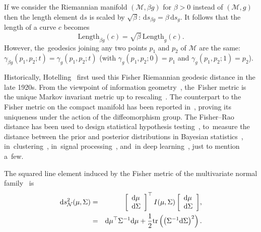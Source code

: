 \documentclass[entropy,article,accept,oneauthor,pdftex,entropy]{Definitions/mdpi}
\def\calM{\mathcal{M}}
\def\vectortwo#1#2{{\left[\begin{array}{l}#1 \cr #2\end{array}\right]}}
\def\tr{\mathrm{tr}}
\def\calN{\mathcal{N}}
\def\Length{\mathrm{Length}}
\def\dSigma{\mathrm{d}\Sigma}
\def\dmu{\mathrm{d}\mu}
\def\ds{\mathrm{d}s}
\begin{document}
\begin{Remark}
If we consider the Riemannian manifold $(\calM,\beta g)$ for $\beta>0$ instead of $(\calM,g)$ then the length element $\ds$ is scaled by $\sqrt{\beta}$: $\ds_{\beta g}=\beta\, \ds_g$. It follows that the length of a curve $c$ becomes
$$
\Length_{\beta g}(c)=\sqrt{\beta}\, \Length_{g}(c).
$$
However, the~geodesics joining any two points $p_1$ and $p_2$ of $\calM$ are the same: $\gamma_{\beta g}(p_1,p_2;t)=\gamma_{g}(p_1,p_2;t)$ 
(with $\gamma_{g}(p_1,p_2;0)=p_1$ and 
$\gamma_{g}(p_1,p_2;1)=p_2$).
\end{Remark}


Historically, Hotelling~\cite{Hotelling-1930} first used this Fisher Riemannian geodesic distance in the late 1920s.
From the viewpoint of information geometry~\cite{IG-2016}, the~Fisher metric is the unique Markov invariant metric up to rescaling~\cite{cencov2000statistical,bauer2016uniqueness,fujiwara2022hommage}.
The counterpart to the Fisher metric on the compact manifold has been reported in~\cite{bruveris2019geometry}, proving its uniqueness under the action of the diffeomorphism group.
The Fisher--Rao distance has been used to design statistical hypothesis testing~\cite{burbea1989rao,SDPMVN-1990,rios1992rao,park1994distances}, to~measure the distance between the prior and posterior distributions in Bayesian statistics~\cite{gruber2008some}, in~clustering~\cite{strapasson2016clustering,le2019quantization},  in~signal processing~\cite{said2015texture,legrand2016evaluating,halder2018gradient,collas2022riemannian}, and~in deep learning~\cite{liang2019fisher}, just to mention a~few.

The squared line element induced by the Fisher metric of the multivariate normal family~\cite{Skovgaard-1981,Skovgaard-1984} is
\begin{eqnarray}
\ds^2_\calN(\mu,\Sigma)&=&\vectortwo{\dmu}{\dSigma}^\top\, I(\mu,\Sigma)\, \vectortwo{\dmu}{\dSigma},\\  \nonumber
&=& \dmu^\top \Sigma^{-1} \dmu + \frac{1}{2}\tr\left(\left(\Sigma^{-1}\dSigma\right)^2\right).
\end{eqnarray}
\end{document}
